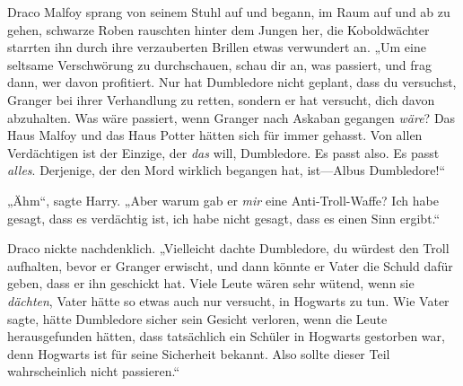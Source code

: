 Draco Malfoy sprang von seinem Stuhl auf und begann, im Raum auf und ab zu gehen, schwarze Roben rauschten hinter dem Jungen her, die Koboldwächter starrten ihn durch ihre verzauberten Brillen etwas verwundert an.
„Um eine seltsame Verschwörung zu durchschauen, schau dir an, was passiert, und frag dann, wer davon profitiert. Nur hat Dumbledore nicht geplant, dass du versuchst, Granger bei ihrer Verhandlung zu retten, sondern er hat versucht, dich davon abzuhalten. Was wäre passiert, wenn Granger nach Askaban gegangen \emph{wäre}? Das Haus Malfoy und das Haus Potter hätten sich für immer gehasst. Von allen Verdächtigen ist der Einzige, der \emph{das} will, Dumbledore. Es passt also. Es passt \emph{alles}. Derjenige, der den Mord wirklich begangen hat, ist—Albus Dumbledore!“

„Ähm“, sagte Harry. „Aber warum gab er \emph{mir} eine Anti-Troll-Waffe? Ich habe gesagt, dass es verdächtig ist, ich habe nicht gesagt, dass es einen Sinn ergibt.“

Draco nickte nachdenklich.
„Vielleicht dachte Dumbledore, du würdest den Troll aufhalten, bevor er Granger erwischt, und dann könnte er Vater die Schuld dafür geben, dass er ihn geschickt hat. Viele Leute wären sehr wütend, wenn sie \emph{dächten}, Vater hätte so etwas auch nur versucht, in Hogwarts zu tun. Wie Vater sagte, hätte Dumbledore sicher sein Gesicht verloren, wenn die Leute herausgefunden hätten, dass tatsächlich ein Schüler in Hogwarts gestorben war, denn Hogwarts ist für seine Sicherheit bekannt. Also sollte dieser Teil wahrscheinlich nicht passieren.“

